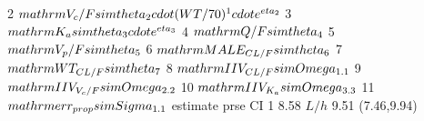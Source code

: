 \begin{Schunk}
\begin{Soutput}
2                                   $\\mathrm{V_{c}/F  \\sim \\theta_{2}\\cdot (WT/70)^{1}\\cdot e^{\\eta_{2}}}$
3                                                        $\\mathrm{K_{a} \\sim \\theta_{3}\\cdot e^{\\eta_{3}}}$
4                                                                             $\\mathrm{Q/F  \\sim \\theta_{4}}$
5                                                                         $\\mathrm{V_{p}/F  \\sim \\theta_{5}}$
6                                                                       $\\mathrm{MALE_{CL/F}\\sim \\theta_{6}}$
7                                                                         $\\mathrm{WT_{CL/F}\\sim \\theta_{7}}$
8                                                                      $\\mathrm{IIV_{CL/F}\\sim \\Omega_{1.1}}$
9                                                                   $\\mathrm{IIV_{V_{c}/F}\\sim \\Omega_{2.2}}$
10                                                                    $\\mathrm{IIV_{K_{a}}\\sim \\Omega_{3.3}}$
11                                                                     $\\mathrm{err_{prop}\\sim \\Sigma_{1.1}}$
                   estimate prse              CI
1              8.58 $ L/h $ 9.51     (7.46,9.94)

\end{Soutput}
\end{Schunk}
